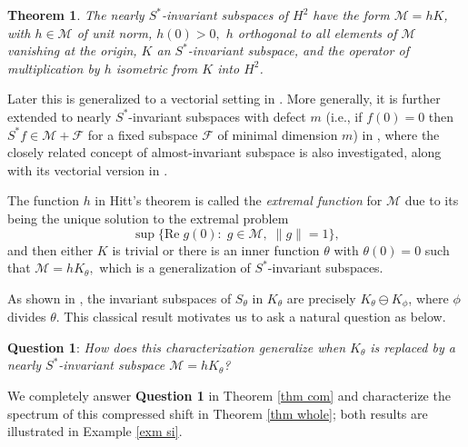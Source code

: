 \documentclass[12pt,reqno]{amsart}
\newtheorem{thm}{Theorem}[section]
\theoremstyle{definition}
\theoremstyle{remark}
\numberwithin{equation}{section}
\newcommand{\ma}{\mathcal}
\begin{document}
\begin{thm}\cite[Proposition 3]{hitt} \label{thm Hitt}The nearly $S^*$-invariant subspaces of $H^2 $ have the form $\ma{M}=hK$, with $h\in \ma{M}$ of unit norm, $h(0)>0,$  $h$ orthogonal to all elements of $\ma{M}$ vanishing at the origin, $K$  an $S^*$-invariant subspace, and the operator of multiplication by $h$  isometric from $K$ into $H^2$.
\end{thm}
Later this is generalized to a vectorial setting in \cite[Theorem 4.4]{CCP10}. More generally, it is further  extended to nearly $S^*$-invariant subspaces with defect $m$ (i.e., if $f(0)=0$ then $S^*f \in \mathcal{M}+ \mathcal{F}$ for a  fixed subspace $\mathcal{F}$ of minimal dimension $m$)  in \cite{CGP}, where the closely related concept  of almost-invariant subspace  is also investigated, along with its vectorial version in \cite{CDP20}.

The function $h$ in Hitt's theorem is called the \emph{extremal function} for $\ma{M}$ due to its being the unique solution to the extremal problem $$\sup\{\mbox{Re}\; g(0):\;g\in \ma{M},\;\|g\|=1\},$$ and then
either $K$ is trivial or there is an inner function $\theta$ with $\theta(0)=0$ such that $\ma{M}=hK_\theta,$ which is a generalization of $S^*$-invariant subspaces.

As shown in \cite[Proposition 9.14]{GMR}, the invariant subspaces of $S_\theta$ in $K_\theta$ are precisely $K_\theta \ominus K_\phi$, where $\phi$ divides $\theta$.
This classical result motivates us to ask a natural question as below.

\begin{center}
  \textbf{ Question 1}: \textit{How does this characterization generalize when $K_\theta$ is replaced by a nearly $S^*$-invariant subspace $\ma{M}= h K_\theta$?}
\end{center}

We completely answer \textbf{Question 1} in Theorem \ref{thm com} and characterize the spectrum of this compressed shift in Theorem \ref{thm whole}; both results are illustrated in Example \ref{exm si}.
 \vspace{0.1mm}
\end{document}
